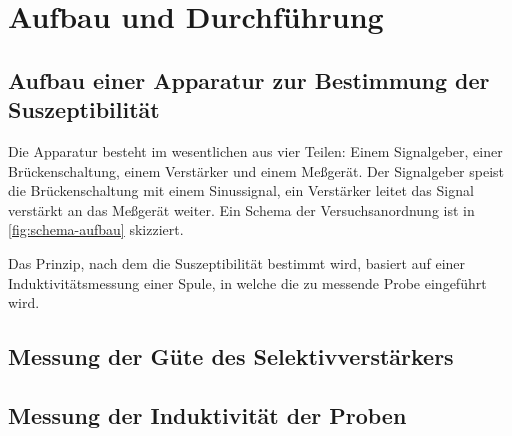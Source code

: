 
\section{Aufbau und Durchführung}

\subsection{Aufbau einer Apparatur zur Bestimmung der Suszeptibilität}

Die Apparatur besteht im wesentlichen aus vier Teilen: Einem
Signalgeber, einer Brückenschaltung, einem Verstärker und einem
Meßgerät. Der Signalgeber speist die Brückenschaltung mit einem
Sinussignal, ein Verstärker leitet das Signal verstärkt an das Meßgerät
weiter. Ein Schema der Versuchsanordnung ist in \cref{fig:schema-aufbau}
skizziert. 

Das Prinzip, nach dem die Suszeptibilität bestimmt wird, basiert auf
einer Induktivitätsmessung einer Spule, in welche die zu messende Probe
eingeführt wird.

\subsection{Messung der Güte des Selektivverstärkers}

\subsection{Messung der Induktivität der Proben}

